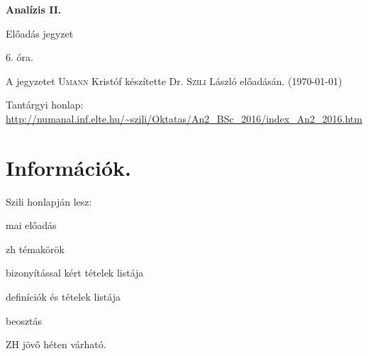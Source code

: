 \documentclass[a4paper,11.5pt]{article}
\begin{document}
	\setlength\parindent{0pt}
	\def\s{\hspace{0.2mm}\vphantom{\beta}}
	\def\Z{\mathbb{Z}}
	\def\Q{\mathbb{Q}}
	\def\R{\mathbb{R}}
	\def\C{\mathbb{C}}
	\def\N{\mathbb{N}}
	\def\Ra{\overline{\mathbb{R}}}
	
	\def\sume{\displaystyle\sum_{n=1}^{+\infty}}
	\def\sumn{\displaystyle\sum_{n=0}^{+\infty}}
	
	\def\narrow{\underset{n\rightarrow+\infty}{\longrightarrow}}
	\def\limn{\displaystyle\lim_{n\to +\infty}}
	\def\limx{\displaystyle\lim_{x\to +\infty}}
	
	
	\theoremstyle{definition}
	\newtheorem{theorem}{Tétel}[subsection] 
	
	\theoremstyle{definition}
	\newtheorem{definition}[theorem]{Definíció} 
	\newtheorem{example}[theorem]{Példa} 
	\newtheorem{task}[theorem]{Feladat} 
	\newtheorem{note}[theorem]{Megjegyzés}
	\newtheorem{revision}[theorem]{Emlékeztető}
	\begin{center}
		{\LARGE\textbf{Analízis II.}}
		
		{\Large Előadás jegyzet}
		
		6. óra.
	\end{center}
	A jegyzetet \textsc{Umann} Kristóf készítette Dr. \textsc{Szili} László  előadásán. (\today)
	
	
	Tantárgyi honlap: \url{http://numanal.inf.elte.hu/~szili/Oktatas/An2_BSc_2016/index_An2_2016.htm}
	
	\section{Információk.}
	Szili honlapján lesz:
	\begin{compactitem}
		\item mai előadás
		\item zh témakörök
		\item bizonyítással kért tételek listája
		\item definíciók és tételek listája
		\item beosztás
	\end{compactitem}
	ZH jövő héten várható.
\end{document}
